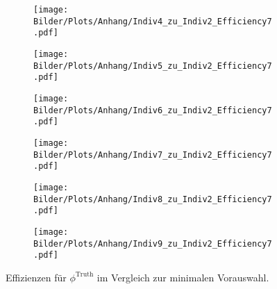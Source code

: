 \begin{figure}
  \begin{subfigure}[t]{0.5\textwidth}
  \texttt{[image: Bilder/Plots/Anhang/Indiv4\_zu\_Indiv2\_Efficiency7.pdf]}
  \end{subfigure}
\begin{subfigure}[t]{0.5\textwidth}
 \texttt{[image: Bilder/Plots/Anhang/Indiv5\_zu\_Indiv2\_Efficiency7.pdf]}
\end{subfigure}
\begin{subfigure}[t]{0.5\textwidth}
  \texttt{[image: Bilder/Plots/Anhang/Indiv6\_zu\_Indiv2\_Efficiency7.pdf]}
\end{subfigure}
\begin{subfigure}[t]{0.5\textwidth}
  \texttt{[image: Bilder/Plots/Anhang/Indiv7\_zu\_Indiv2\_Efficiency7.pdf]}
\end{subfigure}
\begin{subfigure}[t]{0.5\textwidth}
  \texttt{[image: Bilder/Plots/Anhang/Indiv8\_zu\_Indiv2\_Efficiency7.pdf]}
\end{subfigure}
\begin{subfigure}[t]{0.5\textwidth}
  \texttt{[image: Bilder/Plots/Anhang/Indiv9\_zu\_Indiv2\_Efficiency7.pdf]}
\end{subfigure}
\caption{Effizienzen für $\phi^{\text{Truth}}$ im Vergleich zur minimalen Vorauswahl.}
\end{figure}
\clearpage

